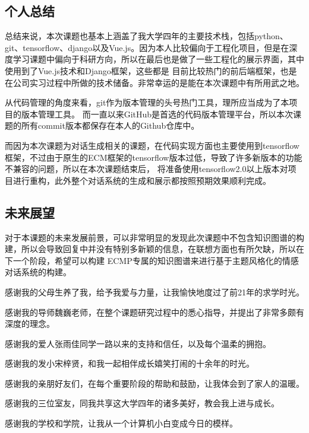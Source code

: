 \documentclass[supercite]{HustGraduPaper}
\theoremstyle{definition}
\begin{document}
\subsection{个人总结}
总结来说，本次课题也基本上涵盖了我大学四年的主要技术栈，包括python、git、tensorflow、django以及Vue.js。因为本人比较偏向于工程化项目，但是在深度学习课题中偏向于科研方向，所以在最后也是做了一些工程化的展示界面，其中使用到了Vue.js技术和Django框架，这些都是
目前比较热门的前后端框架，也是在公司实习过程中所做的技术储备。非常幸运的是能在本次课题中有所用武之地。

从代码管理的角度来看，git作为版本管理的头号热门工具，理所应当成为了本项目的版本管理工具。
而一直以来GitHub是首选的代码版本管理平台，所以本次课题的所有commit版本都保存在本人的Github仓库中。

而因为本次课题为对话生成相关的课题，在代码实现方面也主要使用到tensorflow框架，不过由于原生的ECM框架的tensorflow版本过低，导致了许多新版本的功能不兼容的问题，所以在本次课题结束后，
将准备使用tensorflow2.0以上版本对项目进行重构，此外整个对话系统的生成和展示都按照预期效果顺利完成。

\subsection{未来展望}
对于本课题的未来发展前景，可以非常明显的发现此次课题中不包含知识图谱的构建，所以会导致回复中并没有特别多新颖的信息，在联想方面也有所欠缺，所以在下一个阶段，希望可以构建
ECMP专属的知识图谱来进行基于主题风格化的情感对话系统的构建。


\begin{thankpage}
感谢我的父母生养了我，给予我爱与力量，让我愉快地度过了前21年的求学时光。

感谢我的导师魏巍老师，在整个课题研究过程中的悉心指导，并提出了非常多颇有深度的理念。

感谢我的爱人张雨佳同学一路以来的支持和信任，以及每个温柔的拥抱。

感谢我的发小宋梓贤，和我一起相伴成长嬉笑打闹的十余年的时光。

感谢我的亲朋好友们，在每个重要阶段的帮助和鼓励，让我体会到了家人的温暖。

感谢我的三位室友，同我共享这大学四年的诸多美好，教会我上进与成长。

感谢我的学校和学院，让我从一个计算机小白变成今日的模样。

\end{thankpage}

\nocite{*}


\end{document}
